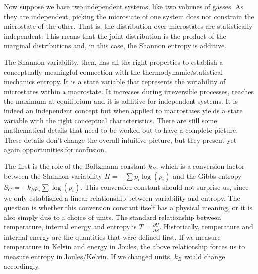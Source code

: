 \documentclass{article}
\begin{document}
Now suppose we have two independent systems, like two volumes of gasses. As they are independent, picking the microstate of one system does not constrain the microstate of the other. That is, the distribution over microstates are statistically independent. This means that the joint distribution is the product of the marginal distributions and, in this case, the Shannon entropy is additive.

The Shannon variability, then, has all the right properties to establish a conceptually meaningful connection with the thermodynamic/statistical mechanics entropy. It is a state variable that represents the variability of microstates within a macrostate. It increases during irreversible processes, reaches the maximum at equilibrium and it is additive for independent systems. It is indeed an independent concept but when applied to macrostates yields a state variable with the right conceptual characteristics. There are still some mathematical details that need to be worked out to have a complete picture. These details don't change the overall intuitive picture, but they present yet again opportunities for confusion.

The first is the role of the Boltzmann constant $k_B$, which is a conversion factor between the Shannon variability $H = - \sum p_i \log(p_i)$ and the Gibbs entropy $S_G = - k_B p_i \sum \log(p_i)$. This conversion constant should not surprise us, since we only established a linear relationship between variability and entropy. The question is whether this conversion constant itself has a physical meaning, or it is also simply due to a choice of units. The standard relationship between temperature, internal energy and entropy is $T = \frac{\partial U}{\partial S}$. Historically, temperature and internal energy are the quantities that were defined first. If we measure temperature in Kelvin and energy in Joules, the above relationship forces us to measure entropy in Joules/Kelvin. If we changed units, $k_B$ would change accordingly.
\end{document}
